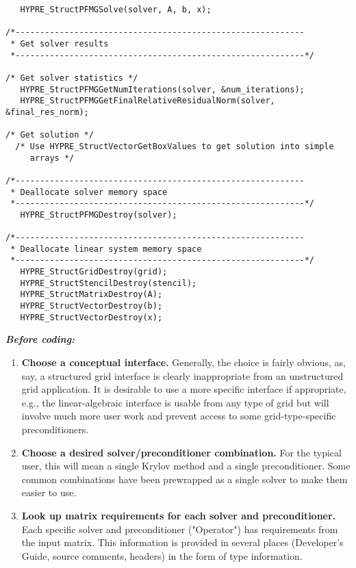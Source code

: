 \begin{itemize}
\begin{display}
\begin{verbatim}
   HYPRE_StructPFMGSolve(solver, A, b, x);

/*-----------------------------------------------------------
 * Get solver results
 *-----------------------------------------------------------*/

/* Get solver statistics */
   HYPRE_StructPFMGGetNumIterations(solver, &num_iterations);
   HYPRE_StructPFMGGetFinalRelativeResidualNorm(solver, &final_res_norm);

/* Get solution */
  /* Use HYPRE_StructVectorGetBoxValues to get solution into simple
     arrays */

/*-----------------------------------------------------------
 * Deallocate solver memory space 
 *-----------------------------------------------------------*/
   HYPRE_StructPFMGDestroy(solver);

/*-----------------------------------------------------------
 * Deallocate linear system memory space 
 *-----------------------------------------------------------*/
   HYPRE_StructGridDestroy(grid);
   HYPRE_StructStencilDestroy(stencil);
   HYPRE_StructMatrixDestroy(A);
   HYPRE_StructVectorDestroy(b);
   HYPRE_StructVectorDestroy(x);

\end{verbatim}
\end{display}


{\bf \it Before coding:}

\begin{enumerate}

\item
{\bf Choose a conceptual interface.} Generally, the choice is fairly obvious, as,
say, a structured grid 
interface is clearly inappropriate from an unstructured grid application. It is
desirable to use a more 
specific interface if appropriate, e.g., the linear-algebraic interface is
usable from any type of grid but 
will involve much more user work and prevent access to some grid-type-specific
preconditioners.

\item 
{\bf Choose a desired solver/preconditioner combination.} For the typical user,
this will mean a single 
Krylov method and a single preconditioner. Some common combinations have been
prewrapped as a 
single solver to make them easier to use. 

\item 
{\bf Look up matrix requirements for each solver and preconditioner.} Each
specific solver and 
preconditioner ("Operator") has requirements from the input matrix. This 
information is provided in several places (Developer's Guide, source comments,
headers) in the form 
of type information.


\end{enumerate}
\end{itemize}
